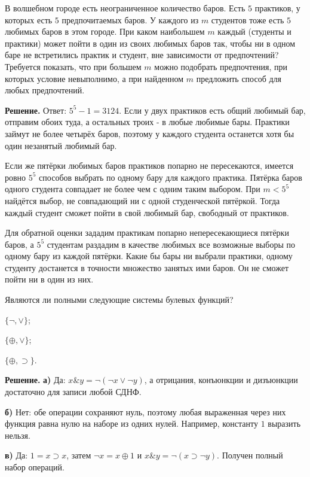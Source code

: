 \begin{problems}
\item В волшебном городе есть неограниченное количество баров. Есть $5$ практиков, у которых есть $5$ предпочитаемых баров. У каждого из $m$ студентов тоже есть $5$ любимых баров в этом городе. При каком наибольшем $m$ каждый (студенты и практики) может пойти в один из своих любимых баров так, чтобы ни в одном баре не встретились практик и студент, вне зависимости от предпочтений? Требуется показать, что при большем $m$ можно подобрать предпочтения, при которых условие невыполнимо, а при найденном $m$ предложить способ для любых предпочтений.
\par\smallskip\noindent\textbf{Решение.} Ответ: $5^5-1=3124$. Если у двух практиков есть общий любимый бар, отправим обоих туда, а остальных троих - в любые любимые бары. Практики займут не более четырёх баров, поэтому у каждого студента останется хотя бы один незанятый любимый бар.
\par Если же пятёрки любимых баров практиков попарно не пересекаются, имеется ровно $5^5$ способов выбрать по одному бару для каждого практика. Пятёрка баров одного студента совпадает не более чем с одним таким выбором. При $m<5^5$ найдётся выбор, не совпадающий ни с одной студенческой пятёркой. Тогда каждый студент сможет пойти в свой любимый бар, свободный от практиков.
\par Для обратной оценки зададим практикам попарно непересекающиеся пятёрки баров, а $5^5$ студентам раздадим в качестве любимых все возможные выборы по одному бару из каждой пятёрки. Какие бы бары ни выбрали практики, одному студенту достанется в точности множество занятых ими баров. Он не сможет пойти ни в один из них.\par

\item Являются ли полными следующие системы булевых функций?
\begin{parts}
  \item $\{\neg,\vee\}$;
  \item $\{\oplus,\vee\}$;
  \item $\{\oplus,\supset\}$.
\end{parts}
\par\smallskip\noindent\textbf{Решение.} \textbf{а)} Да: $x\mathbin{\&}y=\neg(\neg x\vee\neg y)$, а отрицания, конъюнкции и дизъюнкции достаточно для записи любой СДНФ.
\par\textbf{б)} Нет: обе операции сохраняют нуль, поэтому любая выраженная через них функция равна нулю на наборе из одних нулей. Например, константу $1$ выразить нельзя.
\par\textbf{в)} Да: $1=x\supset x$, затем $\neg x=x\oplus1$ и $x\mathbin{\&}y=\neg(x\supset\neg y)$. Получен полный набор операций.\par


\end{problems}
